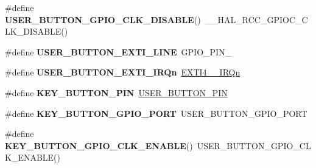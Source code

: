 \begin{DoxyCompactItemize}
\#define {\bfseries U\+S\+E\+R\+\_\+\+B\+U\+T\+T\+O\+N\+\_\+\+G\+P\+I\+O\+\_\+\+C\+L\+K\+\_\+\+D\+I\+S\+A\+B\+LE}()~\+\_\+\+\_\+\+H\+A\+L\+\_\+\+R\+C\+C\+\_\+\+G\+P\+I\+O\+C\+\_\+\+C\+L\+K\+\_\+\+D\+I\+S\+A\+B\+LE()
\item 
\mbox{\label{group___s_t_m32_f0_x_x___n_u_c_l_e_o___b_u_t_t_o_n_gac41d04c2244ba780e4749991c85d1e9a}} 
\#define {\bfseries U\+S\+E\+R\+\_\+\+B\+U\+T\+T\+O\+N\+\_\+\+E\+X\+T\+I\+\_\+\+L\+I\+NE}~G\+P\+I\+O\+\_\+\+P\+I\+N\+\_
\item 
\mbox{\label{group___s_t_m32_f0_x_x___n_u_c_l_e_o___b_u_t_t_o_n_ga2e6e65a053529869d1c370610825d98f}} 
\#define {\bfseries U\+S\+E\+R\+\_\+\+B\+U\+T\+T\+O\+N\+\_\+\+E\+X\+T\+I\+\_\+\+I\+R\+Qn}~\hyperlink{group___peripheral__interrupt__number__definition_gga7e1129cd8a196f4284d41db3e82ad5c8aec19518b6dd2358a8b78c2aa29e5d462}{E\+X\+T\+I4\+\_\+\_\+\+I\+R\+Qn}
\item 
\mbox{\label{group___s_t_m32_f0_x_x___n_u_c_l_e_o___b_u_t_t_o_n_ga5c260a4b4e26836dc3a9b6f15d317421}} 
\#define {\bfseries K\+E\+Y\+\_\+\+B\+U\+T\+T\+O\+N\+\_\+\+P\+IN}~\hyperlink{group___s_t_m32_f0_x_x___n_u_c_l_e_o___b_u_t_t_o_n_ga34df6915e3013d6a0c74131d3946b659}{U\+S\+E\+R\+\_\+\+B\+U\+T\+T\+O\+N\+\_\+\+P\+IN}
\item 
\mbox{\label{group___s_t_m32_f0_x_x___n_u_c_l_e_o___b_u_t_t_o_n_ga98680733a6992dacef531bfd0c23031c}} 
\#define {\bfseries K\+E\+Y\+\_\+\+B\+U\+T\+T\+O\+N\+\_\+\+G\+P\+I\+O\+\_\+\+P\+O\+RT}~U\+S\+E\+R\+\_\+\+B\+U\+T\+T\+O\+N\+\_\+\+G\+P\+I\+O\+\_\+\+P\+O\+RT
\item 
\mbox{\label{group___s_t_m32_f0_x_x___n_u_c_l_e_o___b_u_t_t_o_n_ga6237d656da42b750f63cbf3e329096d5}} 
\#define {\bfseries K\+E\+Y\+\_\+\+B\+U\+T\+T\+O\+N\+\_\+\+G\+P\+I\+O\+\_\+\+C\+L\+K\+\_\+\+E\+N\+A\+B\+LE}()~U\+S\+E\+R\+\_\+\+B\+U\+T\+T\+O\+N\+\_\+\+G\+P\+I\+O\+\_\+\+C\+L\+K\+\_\+\+E\+N\+A\+B\+LE()
\item 
\mbox{\label{group___s_t_m32_f0_x_x___n_u_c_l_e_o___b_u_t_t_o_n_gacf1a6a3b79ec610401d7ffbc1b6115d4}} 

\end{DoxyCompactItemize}
